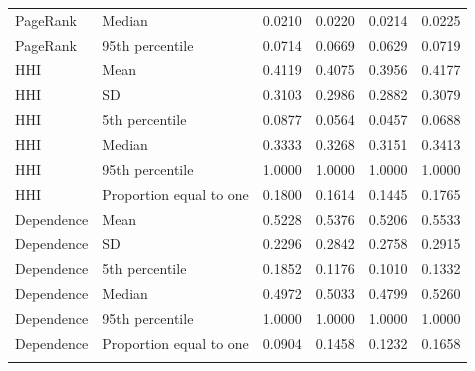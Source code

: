 \documentclass[pdftex,12pt,openright,a4paper,oneside]{book}
\begin{document}
\begin{longtable}{llrrrr}
PageRank & Median & 0.0210 & 0.0220 & 0.0214 & 0.0225 \\
PageRank & 95th percentile & 0.0714 & 0.0669 & 0.0629 & 0.0719 \\
\addlinespace[2pt]
HHI & Mean & 0.4119 & 0.4075 & 0.3956 & 0.4177 \\
HHI & SD & 0.3103 & 0.2986 & 0.2882 & 0.3079 \\
HHI & 5th percentile & 0.0877 & 0.0564 & 0.0457 & 0.0688 \\
HHI & Median & 0.3333 & 0.3268 & 0.3151 & 0.3413 \\
HHI & 95th percentile & 1.0000 & 1.0000 & 1.0000 & 1.0000 \\
HHI & Proportion equal to one & 0.1800 & 0.1614 & 0.1445 & 0.1765 \\
\addlinespace[2pt]
Dependence & Mean & 0.5228 & 0.5376 & 0.5206 & 0.5533 \\
Dependence & SD & 0.2296 & 0.2842 & 0.2758 & 0.2915 \\
Dependence & 5th percentile & 0.1852 & 0.1176 & 0.1010 & 0.1332 \\
Dependence & Median & 0.4972 & 0.5033 & 0.4799 & 0.5260 \\
Dependence & 95th percentile & 1.0000 & 1.0000 & 1.0000 & 1.0000 \\
Dependence & Proportion equal to one & 0.0904 & 0.1458 & 0.1232 & 0.1658 \\
\addlinespace[2pt]
\end{longtable}
\endgroup
\end{document}
